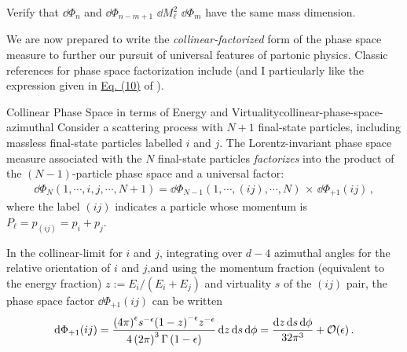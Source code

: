 
\begin{exercise}
    Verify that \(\dd\Phi_n\) and \(\dd\Phi_{n-m+1} \,\, \dd M_\ell^2 \,\, \dd \Phi_m\) have the same mass dimension.
\end{exercise}



We are now prepared to write the \textit{collinear-factorized} form of the phase space measure to further our pursuit of universal features of partonic physics.
%
Classic references for  phase space factorization include  (and I particularly like the expression given in \href{https://arxiv.org/pdf/1407.3272\#equation.3.10}{Eq. (10)} of ).

\begin{lemma}{Collinear Phase Space in terms of Energy and Virtuality}{collinear-phase-space-azimuthal}
    Consider a scattering process with \(N+1\) final-state particles, including massless final-state particles labelled \(i\) and \(j\).
    The Lorentz-invariant phase space measure associated with the \(N\) final-state particles \emph{factorizes} into the product of the \((N-1)\)-particle phase space and a universal factor:
    \begin{align}
        \dd \Phi_{N}(1, \cdots, i, j, \cdots, N+1)
        =
        \dd \Phi_{N-1}(1, \cdots, (ij), \cdots, N)
        \,
        \times
        \,
        \dd\Phi_{+1}(ij)
        \,,
    \end{align}
    where the label \((ij)\) indicates a particle whose momentum is \(P_\ell = p_{(ij)} = p_i + p_j\).


    In the \gls{collinear-limit} for \(i\) and \(j\), integrating over \(d-4\) azimuthal angles for the relative orientation of \(i\) and \(j\),and using the momentum fraction (equivalent to the energy fraction) \(z := E_i / (E_i + E_j)\) and virtuality \(s\) of the \((ij)\) pair, the phase space factor \(\dd\Phi_{+1}(ij)\) can be written
    \begin{align}
        \label{eq:collinear-phase-space-azimuthal}
        \dd \Phi_{+1}(ij)
        =
        \frac{
            {(4\pi)}^{\epsilon}
            s^{-\epsilon}
            {(1-z)}^{-\epsilon} z^{-\epsilon}
        }
        {4 \le(2 \pi\ri)^3 \Gamma\le(1 - \epsilon\ri)}
        \,
        \dd z \, \dd s \, \dd \phi
        =
        \frac{\dd z \, \dd s \, \dd\phi}{32 \pi^3}
        +
        \mathcal{O}(\epsilon)
        \,.
    \end{align}
\end{lemma}


